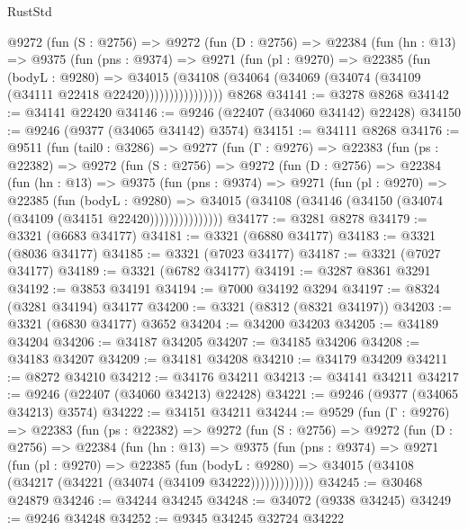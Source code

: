 \begin{lexlean}{RustStd}
\begin{coremodule}
          @9272
            (fun (S : @2756) =>
            @9272
              (fun (D : @2756) =>
              @22384
                (fun (hn : @13) =>
                @9375
                  (fun (pns : @9374) =>
                  @9271
                    (fun (pl : @9270) =>
                    @22385
                      (fun (bodyL : @9280) =>
                      @34015
                        (@34108
                          (@34064 (@34069 (@34074 (@34109 (@34111 @22418 @22420))))))))))))))))
    @8268
@34141 := @3278 @8268
@34142 := @34141 @22420
@34146 := @9246 (@22407 (@34060 @34142) @22428)
@34150 := @9246 (@9377 (@34065 @34142) @3574)
@34151 := @34111 @8268
@34176 := @9511
    (fun (tail0 : @3286) =>
    @9277
      (fun (Γ : @9276) =>
      @22383
        (fun (ps : @22382) =>
        @9272
          (fun (S : @2756) =>
          @9272
            (fun (D : @2756) =>
            @22384
              (fun (hn : @13) =>
              @9375
                (fun (pns : @9374) =>
                @9271
                  (fun (pl : @9270) =>
                  @22385
                    (fun (bodyL : @9280) =>
                    @34015 (@34108 (@34146 (@34150 (@34074 (@34109 (@34151 @22420)))))))))))))))
@34177 := @3281 @8278
@34179 := @3321 (@6683 @34177)
@34181 := @3321 (@6880 @34177)
@34183 := @3321 (@8036 @34177)
@34185 := @3321 (@7023 @34177)
@34187 := @3321 (@7027 @34177)
@34189 := @3321 (@6782 @34177)
@34191 := @3287 @8361 @3291
@34192 := @3853 @34191
@34194 := @7000 @34192 @3294
@34197 := @8324 (@3281 @34194) @34177
@34200 := @3321 (@8312 (@8321 @34197))
@34203 := @3321 (@6830 @34177) @3652
@34204 := @34200 @34203
@34205 := @34189 @34204
@34206 := @34187 @34205
@34207 := @34185 @34206
@34208 := @34183 @34207
@34209 := @34181 @34208
@34210 := @34179 @34209
@34211 := @8272 @34210
@34212 := @34176 @34211
@34213 := @34141 @34211
@34217 := @9246 (@22407 (@34060 @34213) @22428)
@34221 := @9246 (@9377 (@34065 @34213) @3574)
@34222 := @34151 @34211
@34244 := @9529
    (fun (Γ : @9276) =>
    @22383
      (fun (ps : @22382) =>
      @9272
        (fun (S : @2756) =>
        @9272
          (fun (D : @2756) =>
          @22384
            (fun (hn : @13) =>
            @9375
              (fun (pns : @9374) =>
              @9271
                (fun (pl : @9270) =>
                @22385
                  (fun (bodyL : @9280) =>
                  @34015 (@34108 (@34217 (@34221 (@34074 (@34109 @34222)))))))))))))
@34245 := @30468 @24879
@34246 := @34244 @34245
@34248 := @34072 (@9338 @34245)
@34249 := @9246 @34248
@34252 := @9345 @34245 @32724 @34222

\end{coremodule}
\end{lexlean}
